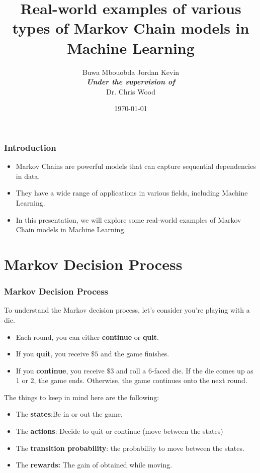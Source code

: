 \documentclass{beamer}
\title{Real-world examples of various types of Markov Chain models in Machine Learning}
\date{\today}
\institute{African Institute for Mathematical Sciences}
\author{Buwa Mbouobda Jordan Kevin\\
{\tiny{\textit{\textbf{Under the supervision of}}}}\\
Dr. Chris Wood
}
\begin{document}
	
	\frame{\titlepage}
	
	\begin{frame}
		\frametitle{Introduction}
		\begin{itemize}
			\item Markov Chains are powerful models that can capture sequential dependencies in data.
			\item They have a wide range of applications in various fields, including Machine Learning.
			\item In this presentation, we will explore some real-world examples of Markov Chain models in Machine Learning.
		\end{itemize}
	\end{frame}
\section{Markov Decision Process}
\begin{frame}
	\frametitle{Markov Decision Process}

		To understand the Markov decision process, let's consider you're playing with a die.
\begin{itemize}
		   \item  Each round, you can either \textbf{continue} or \textbf{quit}.
\item 	If you \textbf{quit}, you receive $\$5$ and the game finishes.
\item 	If you \textbf{continue}, you receive $\$3$ and roll a 6-faced die. If the die comes up as 1 or 2, the game ends. Otherwise, the game continues onto the next round.
\end{itemize}
The things to keep in mind here are the following:
\begin{itemize}
	\item The \textbf{states}:Be in or out the game,
	\item The \textbf{actions}: Decide to quit or continue (move between the states)
	\item The \textbf{transition probability}: the probability to move between the states.
	\item The \textbf{rewards:} The gain of obtained while moving.
\end{itemize}

\end{frame}	
\end{document}
